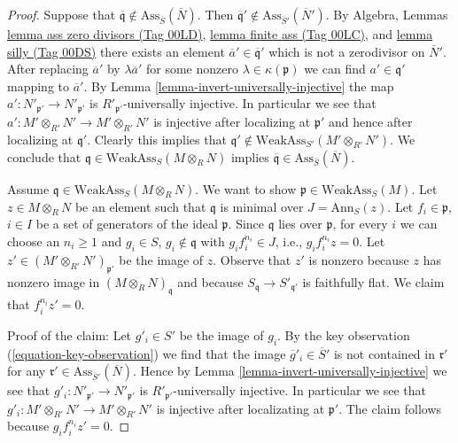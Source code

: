 \documentclass{amsart}
\theoremstyle{plain}
\theoremstyle{definition}
\theoremstyle{remark}
\numberwithin{equation}{subsection}
\begin{document}
\begin{proof}
\medskip\noindent
Suppose that
$\overline{\mathfrak q} \not \in \text{Ass}_{\overline{S}}(\overline{N})$.
Then
$\overline{\mathfrak q}' \not \in \text{Ass}_{\overline{S}'}(\overline{N}')$.
By
Algebra, Lemmas \href{https://stacks.math.columbia.edu/tag/00LD}{lemma ass zero divisors (Tag 00LD)},
\href{https://stacks.math.columbia.edu/tag/00LC}{lemma finite ass (Tag 00LC)}, and
\href{https://stacks.math.columbia.edu/tag/00DS}{lemma silly (Tag 00DS)}
there exists an element $\overline{a}' \in \overline{\mathfrak q}'$
which is not a zerodivisor on $\overline{N}'$.
After replacing $\overline{a}'$ by $\lambda \overline{a}'$ for some nonzero
$\lambda \in \kappa(\mathfrak p)$ we can find
$a' \in \mathfrak q'$ mapping to $\overline{a}'$. By
Lemma \ref{lemma-invert-universally-injective}
the map $a' : N'_{\mathfrak p'} \to N'_{\mathfrak p'}$ is
$R'_{\mathfrak p'}$-universally injective. In particular
we see that $a' : M' \otimes_{R'} N' \to M' \otimes_{R'} N'$ is
injective after localizing at $\mathfrak p'$ and hence after
localizing at $\mathfrak q'$. Clearly this implies that
$\mathfrak q' \not \in \text{WeakAss}_{S'}(M' \otimes_{R'} N')$.
We conclude that $\mathfrak q \in \text{WeakAss}_S(M \otimes_R N)$ implies
$\overline{\mathfrak q} \in \text{Ass}_{\overline{S}}(\overline{N})$.

\medskip\noindent
Assume $\mathfrak q \in \text{WeakAss}_S(M \otimes_R N)$. We want
to show $\mathfrak p \in \text{WeakAss}_S(M)$.
Let $z \in M \otimes_R N$ be an element such that $\mathfrak q$
is minimal over $J = \text{Ann}_S(z)$.
Let $f_i \in \mathfrak p$, $i \in I$ be a set of generators of the
ideal $\mathfrak p$. Since $\mathfrak q$ lies over $\mathfrak p$, for every $i$
we can choose an $n_i \geq 1$ and $g_i \in S$, $g_i \not \in \mathfrak q$
with $g_i f_i^{n_i} \in J$, i.e., $g_i f_i^{n_i} z = 0$.
Let $z' \in (M' \otimes_{R'} N')_{\mathfrak p'}$ be the image of $z$.
Observe that $z'$ is nonzero because $z$ has nonzero image in
$(M \otimes_R N)_\mathfrak q$ and because $S_\mathfrak q \to S'_{\mathfrak q'}$
is faithfully flat. We claim that $f_i^{n_i} z' = 0$.

\medskip\noindent
Proof of the claim: Let $g'_i \in S'$ be the image of $g_i$.
By the key observation (\ref{equation-key-observation})
we find that the image $\overline{g}'_i \in \overline{S}'$
is not contained in $\mathfrak r'$ for any
$\mathfrak r' \in \text{Ass}_{\overline{S}'}(\overline{N})$.
Hence by Lemma \ref{lemma-invert-universally-injective}
we see that $g'_i : N'_{\mathfrak p'} \to N'_{\mathfrak p'}$ is
$R'_{\mathfrak p'}$-universally injective. In particular
we see that $g'_i : M' \otimes_{R'} N' \to M' \otimes_{R'} N'$ is
injective after localizating at $\mathfrak p'$. The claim
follows because $g_i f_i^{n_i} z' = 0$.


\end{proof}
\end{document}
